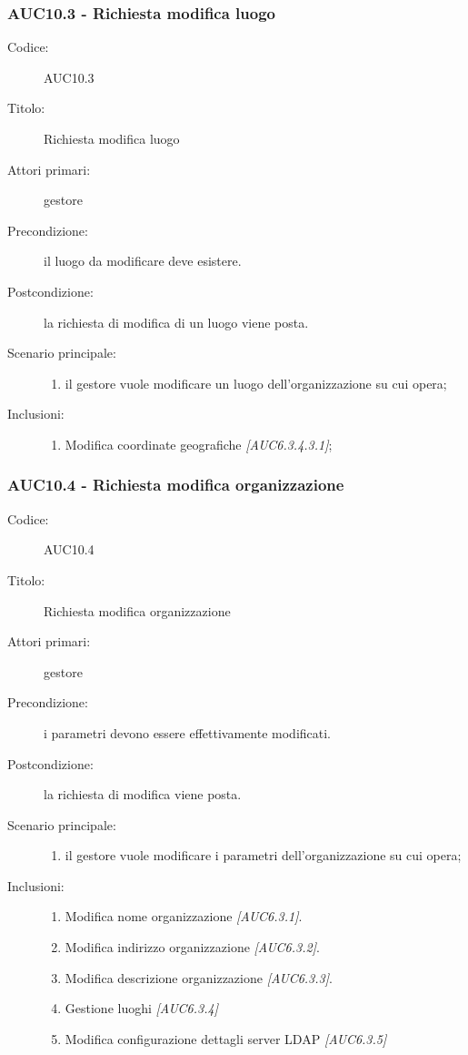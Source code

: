 \documentclass[casi-duso]{subfiles}
\begin{document}
\subsubsection{AUC10.3 - Richiesta modifica luogo}%
\label{subsub:AUC10.3}
\begin{description}
  \item[Codice:] AUC10.3
  \item[Titolo:] Richiesta modifica luogo
  \item[Attori primari:] gestore
  \item[Precondizione:] il luogo da modificare deve esistere.
  \item[Postcondizione:] la richiesta di modifica di un luogo viene posta.
  \item[Scenario principale:]
  \begin{enumerate}
    \item il gestore vuole modificare un luogo dell'organizzazione su cui opera;
  \end{enumerate}
  \item[Inclusioni:]
  \begin{enumerate}
    \item Modifica coordinate geografiche \emph{[AUC6.3.4.3.1]};
  \end{enumerate}
\end{description}

\subsubsection{AUC10.4 - Richiesta modifica organizzazione}%
\label{subsub:AUC10.4}
\begin{description}
  \item[Codice:] AUC10.4
  \item[Titolo:] Richiesta modifica organizzazione
  \item[Attori primari:] gestore
  \item[Precondizione:] i parametri devono essere effettivamente modificati.
  \item[Postcondizione:] la richiesta di modifica viene posta.
  \item[Scenario principale:]
  \begin{enumerate}
    \item il gestore vuole modificare i parametri dell'organizzazione su cui opera;
  \end{enumerate}
  \item[Inclusioni:]
  \begin{enumerate}
    \item Modifica nome organizzazione \emph{[AUC6.3.1]}.
    \item Modifica indirizzo organizzazione \emph{[AUC6.3.2]}.
    \item Modifica descrizione organizzazione \emph{[AUC6.3.3]}.
    \item Gestione luoghi \emph{[AUC6.3.4]}
    \item Modifica configurazione dettagli server LDAP \emph{[AUC6.3.5]}
  \end{enumerate}
\end{description}
\end{document}
